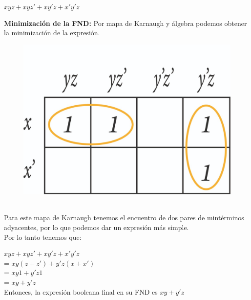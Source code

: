 \documentclass[12pt]{article} %
\begin{document}
\begin{enumerate}
                \begin{center}
                    \textbf{{$xyz + xyz' + xy'z + x'y'z$}}
                \end{center}

            \textbf{Minimización de la FND:}
            Por mapa de Karnaugh y álgebra podemos obtener la minimización 
            de la expresión. 
                \begin{figure}[h!]
                    \centering 
                    \includegraphics[scale=0.2]{Mapa2.jpeg}
                \end{figure}
            \\
            
            Para este mapa de Karnaugh tenemos el encuentro de dos pares de
            mintérminos adyacentes, por lo que podemos dar un expresión
            más simple. 
            \\

            Por lo tanto tenemos que:

            $xyz + xyz' + xy'z + x'y'z$ \\
            = $xy(z + z') + y'z(x + x')$ \\
            = $xy1 + y'z1$ \\
            = $xy + y'z$
            \\

            Entonces, la expresión booleana final en su FND es
            \textbf{{$xy + y'z$}}
            

\end{enumerate}
\end{document}
